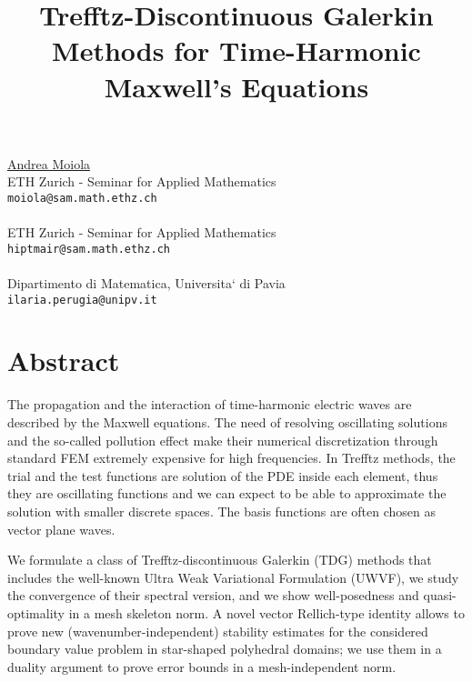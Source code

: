 \title{Trefftz-Discontinuous Galerkin Methods for Time-Harmonic Maxwell's Equations}
 \author{} \institute{}
\maketitle
\begin{center}
{\large \underline{Andrea Moiola}}\\
ETH Zurich - Seminar for Applied Mathematics\\
{\tt moiola@sam.math.ethz.ch}
\\ \vspace{4mm}{\large Ralf Hiptmair}\\
ETH Zurich - Seminar for Applied Mathematics\\
{\tt hiptmair@sam.math.ethz.ch}
\\ \vspace{4mm}{\large Ilaria Perugia}\\
Dipartimento di Matematica, Universita` di Pavia\\
{\tt ilaria.perugia@unipv.it}

\end{center}

\section*{Abstract}

The propagation and the interaction of time-harmonic electric waves are described by the Maxwell equations. The need of resolving oscillating solutions and the so-called pollution effect make their numerical discretization through standard FEM extremely expensive for high
frequencies. In Trefftz methods, the trial and the test functions are solution of the PDE inside each element, thus they are oscillating functions
and we can expect to be able to approximate the solution with smaller discrete spaces. The basis functions are often chosen as vector plane waves.

We formulate a class of Trefftz-discontinuous Galerkin (TDG) methods that includes the well-known Ultra Weak Variational Formulation
(UWVF), we study the convergence of their spectral version, and we show well-posedness and quasi-optimality in a mesh skeleton norm. A novel vector Rellich-type identity allows to prove new (wavenumber-independent) stability estimates for the considered boundary value problem in star-shaped polyhedral domains; we use them in a duality argument to prove error bounds in a mesh-independent norm.

